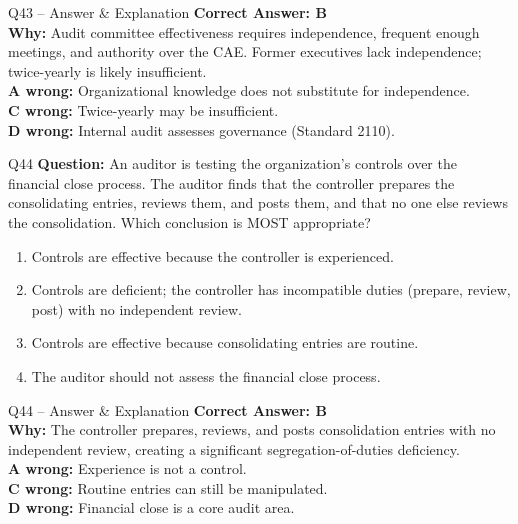 \documentclass[aspectratio=169,10pt]{beamer}
\begin{document}
	\begin{frame}[t]{Q43 -- Answer \& Explanation}
		\small
		\textbf{Correct Answer: B} \\[4pt]
		\textbf{Why:} Audit committee effectiveness requires independence, frequent enough meetings, and authority over the CAE. Former executives lack independence; twice-yearly is likely insufficient. \\[4pt]
		\textbf{A wrong:} Organizational knowledge does not substitute for independence. \\[2pt]
		\textbf{C wrong:} Twice-yearly may be insufficient. \\[2pt]
		\textbf{D wrong:} Internal audit assesses governance (Standard 2110).
	\end{frame}
	
	\begin{frame}[t]{Q44}
		\small
		\textbf{Question:} An auditor is testing the organization's controls over the financial close process. The auditor finds that the controller prepares the consolidating entries, reviews them, and posts them, and that no one else reviews the consolidation. Which conclusion is MOST appropriate?
		\begin{enumerate}[label=\Alph*.,itemsep=1pt,topsep=2pt]
			\item Controls are effective because the controller is experienced.
			\item Controls are deficient; the controller has incompatible duties (prepare, review, post) with no independent review.
			\item Controls are effective because consolidating entries are routine.
			\item The auditor should not assess the financial close process.
		\end{enumerate}
	\end{frame}
	
	\begin{frame}[t]{Q44 -- Answer \& Explanation}
		\small
		\textbf{Correct Answer: B} \\[4pt]
		\textbf{Why:} The controller prepares, reviews, and posts consolidation entries with no independent review, creating a significant segregation-of-duties deficiency. \\[4pt]
		\textbf{A wrong:} Experience is not a control. \\[2pt]
		\textbf{C wrong:} Routine entries can still be manipulated. \\[2pt]
		\textbf{D wrong:} Financial close is a core audit area.
	\end{frame}
	
\end{document}
